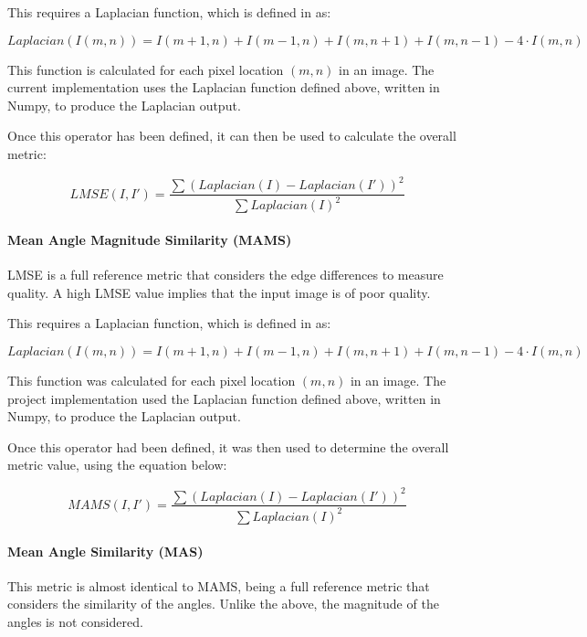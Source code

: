\documentclass[10pt,a4paper]{article}
\begin{document}
                This requires a Laplacian function, which is defined in \cite{LMSEPaper} as:

                $$Laplacian(I(m, n)) = I(m+1, n) + I(m-1, n) + I(m, n+1) + I(m, n-1) - 4\cdot I(m, n)$$

                This function is calculated for each pixel location $(m, n)$ in an image. The current implementation uses the Laplacian function defined above, written in Numpy, to produce the Laplacian output. 
                \cite{LMSEPaper}

                Once this operator has been defined, it can then be used to calculate the overall metric: 

                $$LMSE(I, I') = \frac{\sum (Laplacian(I) - Laplacian(I'))^2}{\sum Laplacian(I)^2}$$
                
            \paragraph{Mean Angle Magnitude Similarity (MAMS)}
            LMSE is a full reference metric that considers the edge differences to measure quality. A high LMSE value implies that the input image is of poor quality. 
                
            This requires a Laplacian function, which is defined in \cite{LMSEPaper} as:

            $$Laplacian(I(m, n)) = I(m+1, n) + I(m-1, n) + I(m, n+1) + I(m, n-1) - 4\cdot I(m, n)$$

            This function was calculated for each pixel location $(m, n)$ in an image. The project implementation used the Laplacian function defined above, written in Numpy, to produce the Laplacian output. 
            \cite{LMSEPaper}

            Once this operator had been defined, it was then used to determine the overall metric value, using the equation below:

            $$MAMS(I, I') = \frac{\sum (Laplacian(I) - Laplacian(I'))^2}{\sum Laplacian(I)^2}$$

            \paragraph{Mean Angle Similarity (MAS)}
            This metric is almost identical to MAMS, being a full reference metric that considers the similarity of the angles. Unlike the above, the magnitude of the angles is not considered.
\end{document}
